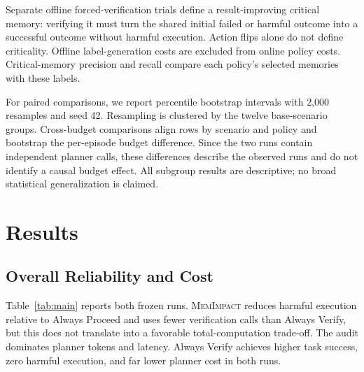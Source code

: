 \documentclass[11pt]{article}
\newcommand{\method}{\textsc{MemImpact}\xspace}
\begin{document}
Separate offline forced-verification trials define a result-improving critical memory: verifying it must turn the shared initial failed or harmful outcome into a successful outcome without harmful execution. Action flips alone do not define criticality. Offline label-generation costs are excluded from online policy costs. Critical-memory precision and recall compare each policy's selected memories with these labels.

For paired comparisons, we report percentile bootstrap intervals with 2,000 resamples and seed 42. Resampling is clustered by the twelve base-scenario groups. Cross-budget comparisons align rows by scenario and policy and bootstrap the per-episode budget difference. Since the two runs contain independent planner calls, these differences describe the observed runs and do not identify a causal budget effect. All subgroup results are descriptive; no broad statistical generalization is claimed.

\section{Results}

\subsection{Overall Reliability and Cost}

Table~\ref{tab:main} reports both frozen runs. \method reduces harmful execution relative to Always Proceed and uses fewer verification calls than Always Verify, but this does not translate into a favorable total-computation trade-off. The audit dominates planner tokens and latency. Always Verify achieves higher task success, zero harmful execution, and far lower planner cost in both runs.
\end{document}
